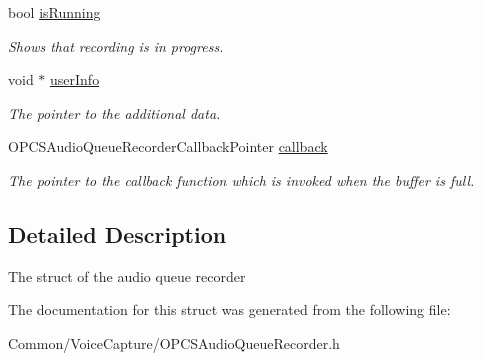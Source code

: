 \begin{DoxyCompactItemize}
\hypertarget{struct_o_p_c_s_audio_queue_recorder_a18225ef498820980191ca786b96c5543}{}\label{struct_o_p_c_s_audio_queue_recorder_a18225ef498820980191ca786b96c5543} 
bool \hyperlink{struct_o_p_c_s_audio_queue_recorder_a18225ef498820980191ca786b96c5543}{is\+Running}
\begin{DoxyCompactList}\small\item\em Shows that recording is in progress. \end{DoxyCompactList}\item 
\hypertarget{struct_o_p_c_s_audio_queue_recorder_a32d9c2a1740995b88d2465c40844617f}{}\label{struct_o_p_c_s_audio_queue_recorder_a32d9c2a1740995b88d2465c40844617f} 
void $\ast$ \hyperlink{struct_o_p_c_s_audio_queue_recorder_a32d9c2a1740995b88d2465c40844617f}{user\+Info}
\begin{DoxyCompactList}\small\item\em The pointer to the additional data. \end{DoxyCompactList}\item 
\hypertarget{struct_o_p_c_s_audio_queue_recorder_a722dcba3c070be70f0a806e8f4f3b9e8}{}\label{struct_o_p_c_s_audio_queue_recorder_a722dcba3c070be70f0a806e8f4f3b9e8} 
O\+P\+C\+S\+Audio\+Queue\+Recorder\+Callback\+Pointer \hyperlink{struct_o_p_c_s_audio_queue_recorder_a722dcba3c070be70f0a806e8f4f3b9e8}{callback}
\begin{DoxyCompactList}\small\item\em The pointer to the callback function which is invoked when the buffer is full. \end{DoxyCompactList}\end{DoxyCompactItemize}


\subsection{Detailed Description}
The struct of the audio queue recorder 

The documentation for this struct was generated from the following file\+:\begin{DoxyCompactItemize}
\item 
Common/\+Voice\+Capture/O\+P\+C\+S\+Audio\+Queue\+Recorder.\+h\end{DoxyCompactItemize}
